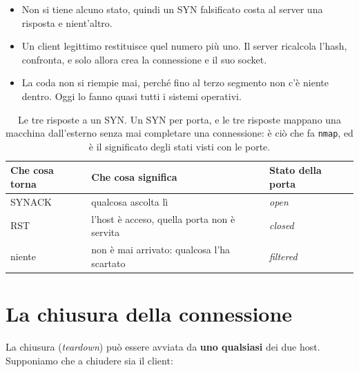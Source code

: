 
\begin{itemize}
    \item Non si tiene alcuno stato, quindi un SYN falsificato costa al server una risposta e nient'altro.
    \item Un client legittimo restituisce quel numero più uno. Il server ricalcola l'hash, confronta, e solo allora crea la
          connessione e il suo socket.
    \item La coda non si riempie mai, perché fino al terzo segmento non c'è niente dentro. Oggi lo fanno quasi tutti i
          sistemi operativi.
\end{itemize}

\begin{table}[H]
\centering
\begin{tabular}{l l l}
\toprule
\textbf{Che cosa torna} & \textbf{Che cosa significa} & \textbf{Stato della porta} \\
\midrule
SYNACK  & qualcosa ascolta lì                          & \emph{open} \\
RST     & l'host è acceso, quella porta non è servita  & \emph{closed} \\
niente  & non è mai arrivato: qualcosa l'ha scartato   & \emph{filtered} \\
\bottomrule
\end{tabular}
\caption{Le tre risposte a un SYN. Un SYN per porta, e le tre risposte mappano una macchina dall'esterno senza mai
         completare una connessione: è ciò che fa \texttt{nmap}, ed è il significato degli stati visti con le porte.}
\end{table}

\section{La chiusura della connessione}

La chiusura (\emph{teardown}) può essere avviata da \textbf{uno qualsiasi} dei due host. Supponiamo che a
chiudere sia il client:

